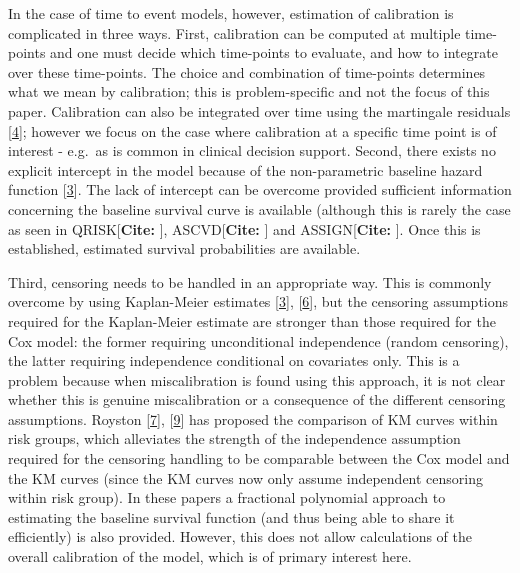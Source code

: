 \documentclass[
]{article}
\begin{document}
In the case of time to event models, however, estimation of calibration is complicated in three ways. First, calibration can be computed at multiple time-points and one must decide which time-points to evaluate, and how to integrate over these time-points. The choice and combination of time-points determines what we mean by calibration; this is problem-specific and not the focus of this paper. Calibration can also be integrated over time using the martingale residuals {[}\protect\hyperlink{ref-crowson_assessing_2016}{4}{]}; however we focus on the case where calibration at a specific time point is of interest - e.g.~as is common in clinical decision support. Second, there exists no explicit intercept in the model because of the non-parametric baseline hazard function {[}\protect\hyperlink{ref-royston_external_2013}{3}{]}. The lack of intercept can be overcome provided sufficient information concerning the baseline survival curve is available (although this is rarely the case as seen in QRISK{[}\textbf{Cite: }{]}, ASCVD{[}\textbf{Cite: }{]} and ASSIGN{[}\textbf{Cite: }{]}. Once this is established, estimated survival probabilities are available.

Third, censoring needs to be handled in an appropriate way. This is commonly overcome by using Kaplan-Meier estimates {[}\protect\hyperlink{ref-royston_external_2013}{3}{]}, {[}\protect\hyperlink{ref-hippisley-cox_derivation_2007}{6}{]}, but the censoring assumptions required for the Kaplan-Meier estimate are stronger than those required for the Cox model: the former requiring unconditional independence (random censoring), the latter requiring independence conditional on covariates only. This is a problem because when miscalibration is found using this approach, it is not clear whether this is genuine miscalibration or a consequence of the different censoring assumptions. Royston {[}\protect\hyperlink{ref-royston_tools_2014}{7}{]}, {[}\protect\hyperlink{ref-royston_tools_2015}{9}{]} has proposed the comparison of KM curves within risk groups, which alleviates the strength of the independence assumption required for the censoring handling to be comparable between the Cox model and the KM curves (since the KM curves now only assume independent censoring within risk group). In these papers a fractional polynomial approach to estimating the baseline survival function (and thus being able to share it efficiently) is also provided. However, this does not allow calculations of the overall calibration of the model, which is of primary interest here.
\end{document}
